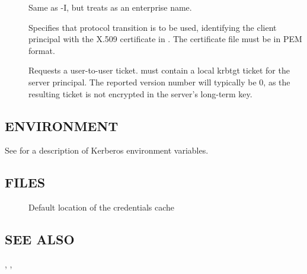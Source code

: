 \documentclass[letterpaper,10pt,english]{sphinxmanual}
\begin{document}
\begin{description}
\item[{ }] \leavevmode
Same as -I, but treats  as an enterprise name.

\item[{ }] \leavevmode
Specifies that protocol transition is to be used, identifying the
client principal with the X.509 certificate in .  The
certificate file must be in PEM format.

\item[{ }] \leavevmode
Requests a user-to-user ticket.   must contain a local
krbtgt ticket for the server principal.  The reported version
number will typically be 0, as the resulting ticket is not
encrypted in the server’s long-term key.

\end{description}


\subsection{ENVIRONMENT}
\label{\detokenize{user/user_commands/kvno:environment}}
See {\hyperref[\detokenize{user/user_config/kerberos:kerberos-7}]{}} for a description of Kerberos environment
variables.


\subsection{FILES}
\label{\detokenize{user/user_commands/kvno:files}}\begin{description}
\item[{}] \leavevmode
Default location of the credentials cache

\end{description}


\subsection{SEE ALSO}
\label{\detokenize{user/user_commands/kvno:see-also}}
{\hyperref[\detokenize{user/user_commands/kinit:kinit-1}]{}}, {\hyperref[\detokenize{user/user_commands/kdestroy:kdestroy-1}]{}}, {\hyperref[\detokenize{user/user_config/kerberos:kerberos-7}]{}}
\end{document}
